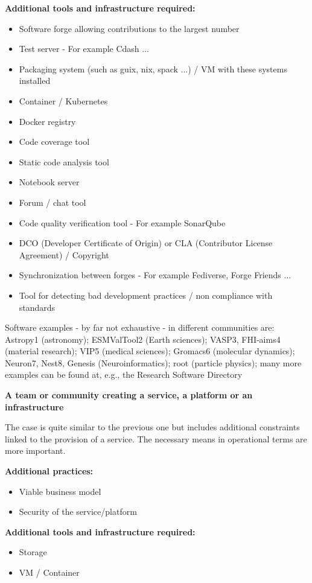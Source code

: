 {\bf Additional tools and infrastructure required:}
\begin{itemize}
\item Software forge allowing contributions to the largest number
\item Test server - For example Cdash ...
\item Packaging system (such as guix, nix, spack ...) / VM with these systems installed
\item Container / Kubernetes
\item Docker registry
\item Code coverage tool
\item Static code analysis tool
\item Notebook server
\item Forum / chat tool
\item Code quality verification tool - For example SonarQube
\item DCO (Developer Certificate of Origin) or CLA (Contributor License Agreement) / Copyright
\item Synchronization between forges - For example Fediverse, Forge Friends ...
\item Tool for detecting bad development practices / non compliance with
standards
\end{itemize}

Software examples - by far not exhaustive - in different communities
are: Astropy1 (astronomy);  ESMValTool2 (Earth sciences); VASP3,
FHI-aims4 (material research); VIP5 (medical sciences); Gromacs6
(molecular dynamics); Neuron7, Nest8, Genesis (Neuroinformatics); root
(particle physics); many more examples can be found at, e.g., the
Research Software Directory


\textbf{A team or community creating a service, a platform or an infrastructure}

The case is quite similar to the previous one but includes additional
constraints linked to the provision of a service. The necessary means
in operational terms are more important. 

{\bf Additional practices:}
\begin{itemize}
\item Viable business model
\item Security of the service/platform
\end{itemize}

{\bf Additional tools and infrastructure required:}
\begin{itemize}
\item Storage
\item VM / Container
\end{itemize}

